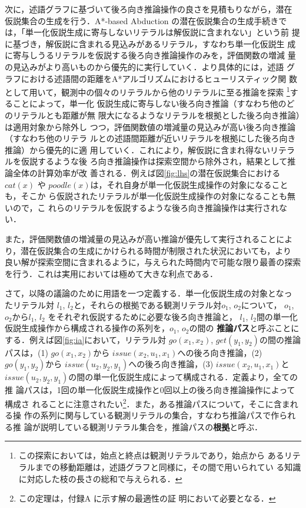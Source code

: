 \documentclass[japanese]{jnlp_1.4}
\begin{document}
次に，述語グラフに基づいて後ろ向き推論操作の良さを見積もりながら，潜在
仮説集合の生成を行う．A*-based Abduction の潜在仮説集合の生成手続きで
は，「単一化仮説生成に寄与しないリテラルは解仮説に含まれない」という前
提に基づき，解仮説に含まれる見込みがあるリテラル，すなわち単一化仮説生
成に寄与しうるリテラルを仮説する後ろ向き推論操作のみを，評価関数の増減
量の見込みがより高いものから優先的に実行していく．より具体的には，述語
グラフにおける述語間の距離をA*アルゴリズムにおけるヒューリスティック関
数として用いて，観測中の個々のリテラルから他のリテラルに至る推論を探索
\footnote{この探索においては，始点と終点は観測リテラルであり，始点から
あるリテラルまでの移動距離は，述語グラフと同様に，その間で用いられてい
る知識に対応した枝の長さの総和で与えられる．}することによって，単一化
仮説生成に寄与しない後ろ向き推論（すなわち他のどのリテラルとも距離が無
限大になるようなリテラルを根拠とした後ろ向き推論）は適用対象から除外し
つつ，評価関数値の増減量の見込みが高い後ろ向き推論（すなわち他のリテラ
ルとの述語間距離が近いリテラルを根拠にした後ろ向き推論）から優先的に適
用していく．これにより，解仮説に含まれ得ないリテラルを仮説するような後
ろ向き推論操作は探索空間から除外され，結果として推論全体の計算効率が改
善される．例えば図\ref{fig:lhs}の潜在仮説集合における$\mathit{cat}(x)$ や
$\mathit{poodle}(x)$は，それ自身が単一化仮説生成操作の対象になることも，そこか
ら仮説されたリテラルが単一化仮説生成操作の対象になることも無いので，こ
れらのリテラルを仮説するような後ろ向き推論操作は実行されない．

また，評価関数値の増減量の見込みが高い推論が優先して実行されることによ
り，潜在仮説集合の生成にかけられる時間が制限された状況においても，より
良い解が探索空間に含まれるように，与えられた時間内で可能な限り最善の探索
を行う．これは実用においては極めて大きな利点である．

さて，以降の議論のために用語を一つ定義する．単一化仮説生成の対象となっ
たリテラル対
$l_1$, $l_2$と，それらの根拠である観測リテラル対$o_1$, $o_2$について，
$o_1$, $o_2$から$l_1$, $l_2$ をそれぞれ仮説するために必要な後ろ向き推論と，
$l_1$, $l_2$間の単一化仮説生成操作から構成される操作の系列を，$o_1$, $o_2$の間の{\bf
推論パス}と呼ぶことにする．例えば図\ref{fig:ia}において，リテラル対
$\mathit{go}(x_1,x_2)$, $\mathit{get}(y_1,y_2)$の間の推論パスは，(1) $\mathit{go}(x_1,x_2)$から
$\mathit{issue}(x_2,u_1,x_1)$への後ろ向き推論，(2) $\mathit{go}(y_1,y_2)$から
$\mathit{issue}(u_2,y_2,y_1)$への後ろ向き推論，(3) $\mathit{issue}(x_2,u_1,x_1)$と
$\mathit{issue}(u_2,y_2,y_1)$の間の単一化仮説生成によって構成される．定義より，全ての推
論パスは，1回の単一化仮説生成操作と0回以上の後ろ向き推論操作によって構成さ
れることに注意されたい\footnote{この定理は，付録A に示す解の最適性の証
明において必要となる．}．また，ある推論パスについて，そこに含まれる操
作の系列に関与している観測リテラルの集合，すなわち推論パスで作られる推
論が説明している観測リテラル集合を，推論パスの{\bf 根拠}と呼ぶ．
\end{document}
